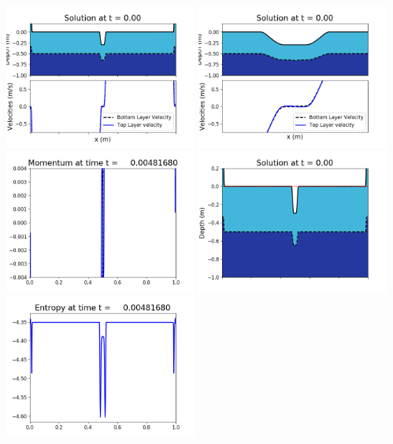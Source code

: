\documentclass[11pt]{article}
\begin{document}
\vskip 10pt 
\includegraphics[width=0.475\textwidth]{frame0012fig1001.png}
\includegraphics[width=0.475\textwidth]{frame0012fig1002.png}
\vskip 10pt 
\includegraphics[width=0.475\textwidth]{frame0012fig1003.png}
\includegraphics[width=0.475\textwidth]{frame0012fig1006.png}
\vskip 10pt 
\includegraphics[width=0.475\textwidth]{frame0012fig1007.png}
\end{document}
